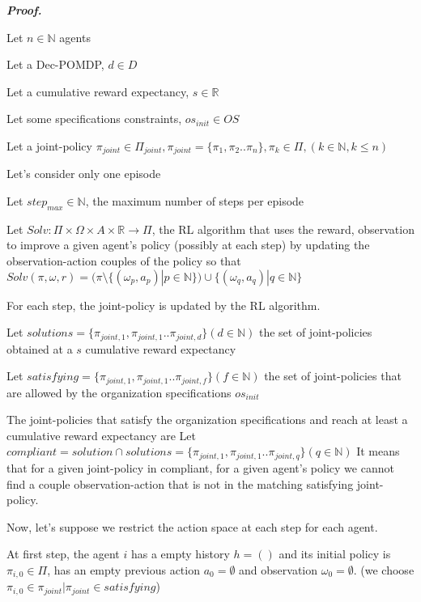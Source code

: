 \documentclass{ecai}
\newcounter{proof}
\renewcommand{\theproof}{\arabic{proof}}
\renewenvironment{proof}[1][]{
    \refstepcounter{proof}
    \noindent \raggedright \textit{\textbf{Proof. \theproof}}

    \setlength{\leftskip}{1em}

}
{

\
\setlength{\leftskip}{0pt}
}
\begin{document}
\begin{proof}\label{proof:jpc_to_ac}
    
    Let $n \in \mathbb{N}$ agents
    
    Let a Dec-POMDP, $d \in D$
    
    Let a cumulative reward expectancy, $s \in \mathbb{R}$
    
    Let some specifications constraints, $os_{init} \in OS$
    
    Let a joint-policy $\pi_{joint} \in \Pi_{joint}, \allowbreak \pi_{joint} = \{\pi_1,\pi_2..\pi_n\}, \pi_k \in \Pi,(k \in \mathbb{N}, k \leq n)$
    
    Let's consider only one episode
    
    Let $step_{max} \in \mathbb{N}$, the maximum number of steps per episode
    
    Let $Solv: \Pi \times \Omega \times A \times \mathbb{R} \rightarrow \Pi$, the RL algorithm that uses the reward, observation to improve a given agent's policy (possibly at each step) by updating the observation-action couples of the policy so that $Solv(\pi, \omega, r) = (\pi \setminus \{(\omega_p, a_p) | p \in \mathbb{N}\}) \cup \{(\omega_q, a_q) | q \in \mathbb{N}\}$
    
    For each step, the joint-policy is updated by the RL algorithm.
    
    Let $solutions = \{\pi_{joint,1}, \pi_{joint,1}.. \pi_{joint,d}\} (d \in \mathbb{N})$ the set of joint-policies obtained at a $s$ cumulative reward expectancy
    
    Let $satisfying = \{\pi_{joint,1}, \pi_{joint,1}.. \pi_{joint,f}\} (f \in \mathbb{N})$ the set of joint-policies that are allowed by the organization specifications $os_{init}$
    
    The joint-policies that satisfy the organization specifications and reach at least a cumulative reward expectancy are
    Let $compliant = solution \cap solutions = \{\pi_{joint,1}, \pi_{joint,1}.. \pi_{joint,q}\} (q \in \mathbb{N})$
    It means that for a given joint-policy in compliant, for a given agent's policy we cannot find a couple observation-action that is not in the matching satisfying joint-policy.

    Now, let's suppose we restrict the action space at each step for each agent.

    At first step, the agent $i$ has a empty history $h = ()$ and its initial policy is $\pi_{i,0} \in \Pi$, has an empty previous action $a_0 = \emptyset$ and observation $\omega_0 = \emptyset$.
    (we choose $\pi_{i,0} \in \pi_{joint} | \pi_{joint} \in satisfying$)


\end{proof}
\end{document}
